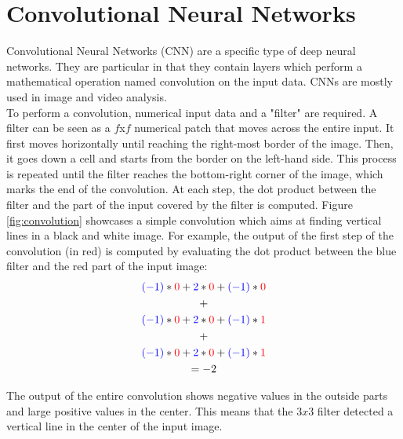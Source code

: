 \section{Convolutional Neural Networks}

\setlength{\marginparwidth}{3cm}\leavevmode {}Convolutional Neural Networks (CNN) are a specific type of deep neural networks. They are particular in that they contain layers which perform a mathematical operation named convolution on the input data. CNNs are mostly used in image and video analysis.\\
To perform a convolution, numerical input data and a "filter" are required. A filter can be seen as a $f$x$f$ numerical patch that moves across the entire input. It first moves horizontally until reaching the right-most border of the image. Then, it goes down a cell and starts from the border on the left-hand side. This process is repeated until the filter reaches the bottom-right corner of the image, which marks the end of the convolution. At each step, the dot product between the filter and the part of the input covered by the filter is computed. Figure \ref{fig:convolution} showcases a simple convolution which aims at finding vertical lines in a black and white image. For example, the output of the first step of the convolution (in red) is computed by evaluating the dot product between the blue filter and the red part of the input image: 
\begin{equation}
\begin{gathered}
\color{blue}(-1) \color{black}* \color{red}0 \color{black}+ \color{blue}2 \color{black}* \color{red}0 \color{black}+ \color{blue}(-1) \color{black}* \color{red}0
\\ \color{black}+ \\ 
\color{blue}(-1) \color{black}* \color{red}0 \color{black}+ \color{blue}2 \color{black}* \color{red}0 \color{black}+ \color{blue}(-1) \color{black}* \color{red}1 
\\ \color{black}+ \\ 
\color{blue}(-1) \color{black}* \color{red}0 \color{black}+ \color{blue}2 \color{black}* \color{red}0 \color{black}+ \color{blue}(-1) \color{black}* \color{red}1 
\\ \color{black}= -2
\end{gathered}
\end{equation}

\noindent The output of the entire convolution shows negative values in the outside parts and large positive values in the center. This means that the $3x3$ filter detected a vertical line in the center of the input image. 

